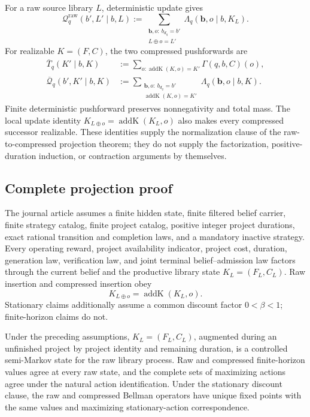 For a raw source library \(L\), deterministic update gives
\[
 \mathcal Q_q^{\mathrm{raw}}(b',L'\mid b,L)
 :=\sum_{\substack{\mathbf b,o:\ b_{d_q}=b'\\L\oplus o=L'}}
   \Lambda_q(\mathbf b,o\mid b,K_L).
\]
For realizable \(K=(F,C)\), the two compressed pushforwards are
\begin{align}
 \overline T_q(K'\mid b,K)
   &:=\sum_{o:\operatorname{addK}(K,o)=K'}
       \Gamma(q,b,C)(o),
   \label{eq:or-compressed-outcome-law}\\
 \overline{\mathcal Q}_q(b',K'\mid b,K)
   &:=\sum_{\substack{\mathbf b,o:\ b_{d_q}=b'\\
       \operatorname{addK}(K,o)=K'}}
       \Lambda_q(\mathbf b,o\mid b,K).
   \label{eq:or-compressed-joint-law}
\end{align}
Finite deterministic pushforward preserves nonnegativity and total mass.
The local update identity
\(K_{L\oplus o}=\operatorname{addK}(K_L,o)\) also makes every compressed
successor realizable. These identities supply the normalization clause of the
raw-to-compressed projection theorem; they do not supply the factorization,
positive-duration induction, or contraction arguments by themselves.

\subsection{Complete projection proof}

The journal article assumes a finite hidden state, finite filtered belief
carrier, finite strategy catalog, finite project catalog, positive integer
project durations, exact rational transition and completion laws, and a
mandatory inactive strategy. Every operating reward, project availability
indicator, project cost, duration, generation law, verification law, and
joint terminal belief--admission law factors through the current belief and
the productive library state \(K_L=(F_L,C_L)\). Raw insertion and compressed
insertion obey
\begin{equation}
 K_{L\oplus o}=\operatorname{addK}(K_L,o).
 \label{eq:or-local-update}
\end{equation}
Stationary claims additionally assume a common discount factor
$0<\beta<1$; finite-horizon claims do not.

\begin{theorem}
\label{thm:or-raw-compressed-projection}
Under the preceding assumptions, $K_L=(F_L,C_L)$, augmented during an
unfinished project by project identity and remaining duration, is a
controlled semi-Markov state for the raw library process. Raw and compressed
finite-horizon values agree at every raw state, and the complete sets of
maximizing actions agree under the natural action identification. Under the
stationary discount clause, the raw and compressed Bellman operators have
unique fixed points with the same values and maximizing stationary-action
correspondence.
\end{theorem}

